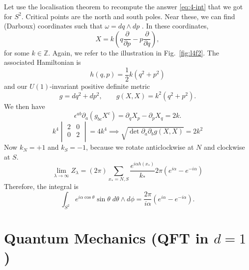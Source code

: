 
\begin{example}[]
  Let use the localisation theorem to recompute the answer \eqref{eq:4-int} that we got for $S^2$.
  Critical points are the north and south poles.
  Near these, we can find (Darboux) coordinates such that $\omega = dq \wedge d p$ .
  In these coordinates,
  \begin{equation}
    X = k \left( q \frac{\partial }{\partial p} - p \frac{\partial }{\partial q} \right),
  \end{equation}
  for some $k \in \mathbb{Z}$.
  Again, we refer to the illustration in Fig.~\ref{fig:l4f2}.
  The associated Hamiltonian is
  \begin{equation}
    h(q, p) = \frac{1}{2} k (q^2 + p^2)
  \end{equation}
  and our $U(1)$-invariant positive definite metric
  \begin{equation}
    g = dq^2 + dp^2, \qquad g(X, X) = k^2 (q^2 + p^2).
  \end{equation}
  We then have
  \begin{equation}
    \epsilon^{ab} \partial_{a} (g_{bc} X^{c}) = \partial_{q} X_{p} - \partial_{p} X_{q} = 2k.
  \end{equation}
  \begin{equation}
    k^4 
    \begin{vmatrix}
     2 & 0 \\
     0 & 2 \\
    \end{vmatrix}
    = 4 k^4 \implies \sqrt{\det \partial_{a} \partial_{b} g(X, X)} = 2 k^2
  \end{equation}
  Now $k_N = +1$ and  $k_S = -1$, because we rotate anticlockwise at  $N$ and clockwise at $S$.
   \begin{equation}
     \lim_{\lambda \to \infty} Z_{\lambda} = (2\pi) \sum_{x_* = N, S} \frac{e^{i \alpha h(x_*)}}{k_*} 2 \pi \left( e^{i \alpha} - e^{-i\alpha} \right)
  \end{equation}
  Therefore, the integral is
  \begin{equation}
    \int_{S^2} e^{i \alpha \cos \theta} \sin \theta \; d\theta \wedge d\phi = \frac{2 \pi }{i \alpha} \left( e^{i\alpha} - e^{-i\alpha} \right).
  \end{equation}
\end{example}

\chapter{Quantum Mechanics (QFT in \texorpdfstring{$d = 1$}{One Dimension})}%
\label{cha:quantum_mechanics_qft_in_$d = 1$_one_dimension_}

